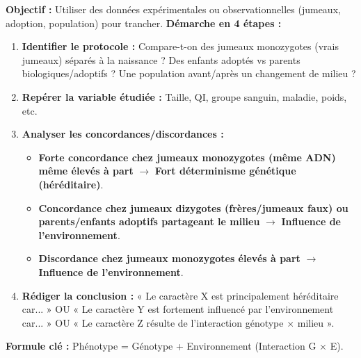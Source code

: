 \documentclass[11pt]{article}
\newcommand{\cle}[1]{{\popxbold\color{popdark}#1}}
\begin{document}
\begin{methode}
\textbf{Objectif :} Utiliser des données expérimentales ou observationnelles (jumeaux, adoption, population) pour trancher.
\textbf{Démarche en 4 étapes :}
\begin{enumerate}
    \item \textbf{Identifier le protocole :} Compare-t-on des \cle{jumeaux monozygotes (vrais jumeaux)} séparés à la naissance ? Des enfants adoptés vs parents biologiques/adoptifs ? Une population avant/après un changement de milieu ?
    \item \textbf{Repérer la variable étudiée :} Taille, QI, groupe sanguin, maladie, poids, etc.
    \item \textbf{Analyser les concordances/discordances :}
    \begin{itemize}
        \item \textbf{Forte concordance chez jumeaux monozygotes (même ADN) même élevés à part} $\rightarrow$ \textbf{Fort déterminisme génétique (héréditaire)}.
        \item \textbf{Concordance chez jumeaux dizygotes (frères/jumeaux faux) ou parents/enfants adoptifs partageant le milieu} $\rightarrow$ \textbf{Influence de l'environnement}.
        \item \textbf{Discordance chez jumeaux monozygotes élevés à part} $\rightarrow$ \textbf{Influence de l'environnement}.
    \end{itemize}
    \item \textbf{Rédiger la conclusion :} « Le caractère X est principalement héréditaire car... » OU « Le caractère Y est fortement influencé par l'environnement car... » OU « Le caractère Z résulte de l'interaction génotype $\times$ milieu ».
\end{enumerate}
\textbf{Formule clé :} \cle{Phénotype = Génotype + Environnement} (Interaction G $\times$ E).
\end{methode}
\end{document}
